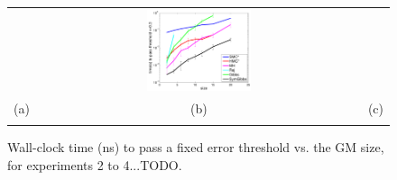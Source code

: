 \documentclass{article}
\newcommand{\nnn}{0.33}
\newcommand{\nnh}{0.23}
\begin{document}
\begin{figure}[t!]
\begin{center}
\begin{tabular}{ccc}
& \hspace{-3mm} \includegraphics[width=\nnn\textwidth, height=\nnh\textwidth]{plotsx/collisionx/time_vs_param-errorbar.pdf}%
\vspace{-1.5mm}
\\
\hspace{-5mm} \footnotesize(a) 
& \hspace{-4mm} \footnotesize(b) 
& \hspace{-3mm} \footnotesize(c) \\
\multicolumn{3}{c}{}
\end{tabular}
\end{center}
\vspace{-8mm}
\caption{\footnotesize Wall-clock time (ns) to pass a fixed error threshold vs. the GM size, for experiments 2 to 4...TODO.}
\label{fig:mom2}
\vspace{-4mm}
\end{figure}
\end{document}
